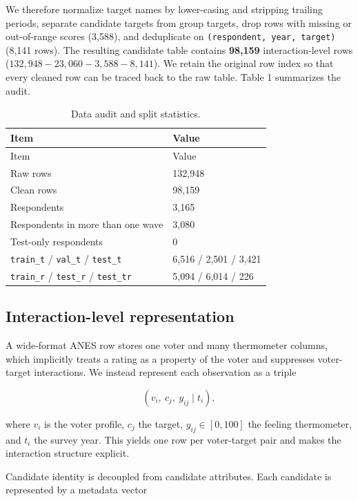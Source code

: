We therefore normalize target names by lower-casing and stripping
trailing periods, separate candidate targets from group targets, drop
rows with missing or out-of-range scores (3,588), and deduplicate on
\texttt{(respondent,\ year,\ target)} (8,141 rows). The resulting
candidate table contains \textbf{98,159} interaction-level rows
(\(132{,}948 - 23{,}060 - 3{,}588 - 8{,}141\)). We retain the original
row index so that every cleaned row can be traced back to the raw table.
Table 1 summarizes the audit.

\begin{longtable}[]{@{}ll@{}}
\caption{Data audit and split
statistics.\label{tab:audit}}\tabularnewline
\toprule\noalign{}
Item & Value \\
\midrule\noalign{}
\endfirsthead
\toprule\noalign{}
Item & Value \\
\midrule\noalign{}
\endhead
\bottomrule\noalign{}
\endlastfoot
Raw rows & 132,948 \\
Clean rows & 98,159 \\
Respondents & 3,165 \\
Respondents in more than one wave & 3,080 \\
Test-only respondents & 0 \\
\texttt{train\_t} / \texttt{val\_t} / \texttt{test\_t} & 6,516 / 2,501 /
3,421 \\
\texttt{train\_r} / \texttt{test\_r} / \texttt{test\_tr} & 5,094 / 6,014
/ 226 \\
\end{longtable}

\subsection{Interaction-level
representation}\label{interaction-level-representation}

A wide-format ANES row stores one voter and many thermometer columns,
which implicitly treats a rating as a property of the voter and
suppresses voter-target interactions. We instead represent each
observation as a triple

\[
(v_i,\ c_j,\ y_{ij}\mid t_i),
\]

where \(v_i\) is the voter profile, \(c_j\) the target,
\(y_{ij}\in[0,100]\) the feeling thermometer, and \(t_i\) the survey
year. This yields one row per voter-target pair and makes the
interaction structure explicit.

Candidate identity is decoupled from candidate attributes. Each
candidate is represented by a metadata vector

